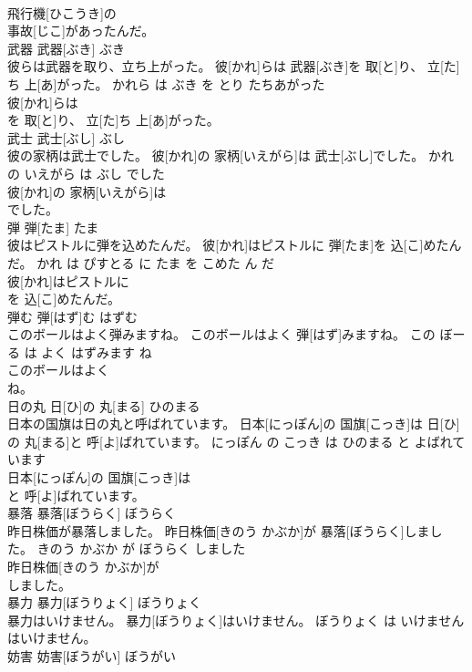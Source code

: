 \documentclass[8pt]{extreport}
\begin{document}
\begin{CJK}{UTF8}{min}
\\	飛行機[ひこうき]の
\\	事故[じこ]があったんだ。			
\\	武器	武器[ぶき]	ぶき	
\\	彼らは武器を取り、立ち上がった。	彼[かれ]らは 武器[ぶき]を 取[と]り、 立[た]ち 上[あ]がった。	かれら は ぶき を とり たちあがった	
\\	彼[かれ]らは
\\	を 取[と]り、 立[た]ち 上[あ]がった。			
\\	武士	武士[ぶし]	ぶし	
\\	彼の家柄は武士でした。	彼[かれ]の 家柄[いえがら]は 武士[ぶし]でした。	かれ の いえがら は ぶし でした	
\\	彼[かれ]の 家柄[いえがら]は
\\	でした。			
\\	弾	弾[たま]	たま	
\\	彼はピストルに弾を込めたんだ。	彼[かれ]はピストルに 弾[たま]を 込[こ]めたんだ。	かれ は ぴすとる に たま を こめた ん だ	
\\	彼[かれ]はピストルに
\\	を 込[こ]めたんだ。			
\\	弾む	弾[はず]む	はずむ	
\\	このボールはよく弾みますね。	このボールはよく 弾[はず]みますね。	この ぼーる は よく はずみます ね	
\\	このボールはよく
\\	ね。			
\\	日の丸	日[ひ]の 丸[まる]	ひのまる	
\\	日本の国旗は日の丸と呼ばれています。	日本[にっぽん]の 国旗[こっき]は 日[ひ]の 丸[まる]と 呼[よ]ばれています。	にっぽん の こっき は ひのまる と よばれて います	
\\	日本[にっぽん]の 国旗[こっき]は
\\	と 呼[よ]ばれています。			
\\	暴落	暴落[ぼうらく]	ぼうらく	
\\	昨日株価が暴落しました。	昨日株価[きのう かぶか]が 暴落[ぼうらく]しました。	きのう かぶか が ぼうらく しました	
\\	昨日株価[きのう かぶか]が
\\	しました。			
\\	暴力	暴力[ぼうりょく]	ぼうりょく	
\\	暴力はいけません。	暴力[ぼうりょく]はいけません。	ぼうりょく は いけません	
\\	はいけません。			
\\	妨害	妨害[ぼうがい]	ぼうがい	

\end{CJK}
\end{document}
